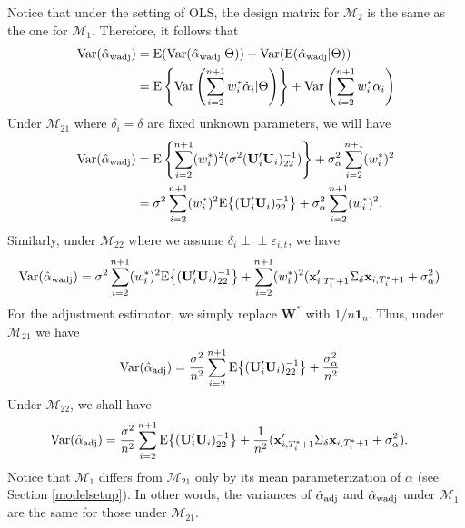 \documentclass[11pt]{article}
\def\mbf#1{\mathbf{#1}} %
\newcommand{\indep}{\perp \!\!\! \perp } %
\def\mrm#1{\mathrm{#1}} %
\def\mc#1{\mathcal{#1}} %
\def\E#1{\mathrm{E}(#1)} %
\def\var#1{\mathrm{Var}(#1)} %
\theoremstyle{definition}
\begin{document}
Notice that under the setting of OLS, the design matrix for $\mc{M}_2$ is the same as the one for $\mc{M}_1$. Therefore, it follows that
  \begin{align*}
  \var{\hat{\alpha}_{\rm wadj}} 
  &= \E{\var{\hat{\alpha}_{\rm wadj}|\Theta}} + \var{\E{\hat{\alpha}_{\rm wadj}|\Theta}} \\
  &=\mrm{E} \left\{\mrm{Var}\left(\sum_{i=2}^{n+1} w_i^*\hat{\alpha}_i|\Theta\right)\right\} +\mrm{Var}\left(\sum_{i=2}^{n+1} w_i^*\alpha_i\right) 
\end{align*}
Under $\mc{M}_{21}$ where $\delta_i=\delta$ are fixed unknown parameters,  we will have
  \begin{align}
  \var{\hat{\alpha}_{\rm wadj}} 
  &= \mrm{E} \left\{\sum_{i=2}^{n+1}(w_i^*)^2(\sigma^2(\mbf{U}'_i\mbf{U}_i)^{-1}_{22})\right\} +\sigma^2_{\alpha}\sum_{i=2}^{n+1}(w_i^*)^2  \nonumber\\
  &= \sigma^2\sum_{i=2}^{n+1}(w_i^*)^2\mrm{E}\big\{(\mbf{U}'_i\mbf{U}_i)^{-1}_{22}\big\}+\sigma^2_{\alpha}\sum_{i=2}^{n+1}(w_i^*)^2.\label{equation6}
\end{align}
Similarly, under $\mc{M}_{22}$ where we assume $\delta_i \indep \varepsilon_{i,t}$, we have
 \begin{align*}
  \var{\hat{\alpha}_{\rm wadj}} 
  &= \sigma^2\sum_{i=2}^{n+1}(w_i^*)^2\mrm{E}\big\{(\mbf{U}'_i\mbf{U}_i)^{-1}_{22}\big\}
  + \sum_{i=2}^{n+1} (w_i^*)^2 (\mbf{x}_{i, T_i^*+1}'\Sigma_{\delta}\mbf{x}_{i, T_i^*+1} + \sigma^2_{\alpha})
\end{align*}
For the adjustment estimator, we simply replace $\mbf{W}^*$ with $1/n\mbf{1}_n$. Thus, under $\mc{M}_{21}$ we have 
 \begin{align*}
  \var{\hat{\alpha}_{\rm adj}} 
  &=\frac{\sigma^2}{n^2}\sum_{i=2}^{n+1}\mrm{E}\big\{(\mbf{U}'_i\mbf{U}_i)^{-1}_{22}\big\}+\frac{\sigma^2_{\alpha}}{n^2}
\end{align*}
Under $\mc{M}_{22}$, we shall have
 \begin{align*}
  \var{\hat{\alpha}_{\rm adj}} 
  &=\frac{\sigma^2}{n^2}\sum_{i=2}^{n+1}\mrm{E}\big\{(\mbf{U}'_i\mbf{U}_i)^{-1}_{22}\big\}+\frac{1}{n^2}(\mbf{x}_{i, T_i^*+1}'\Sigma_{\delta}\mbf{x}_{i, T_i^*+1} + \sigma^2_{\alpha}).
\end{align*}
Notice that $\mc{M}_{1}$ differs from $\mc{M}_{21}$ only by its mean parameterization of $\alpha$ (see Section \ref{modelsetup}). In other words, the variances of $\hat{\alpha}_{\rm adj}$ and $\hat{\alpha}_{\rm wadj}$ under $\mc{M}_1$ are the same for those under $\mc{M}_{21}$.
\end{document}
